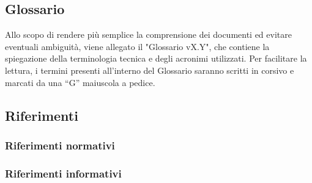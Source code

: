	\subsection{Glossario}
		Allo scopo di rendere più semplice la comprensione dei documenti ed evitare eventuali ambiguità, viene allegato il "Glossario vX.Y", che contiene la spiegazione della terminologia tecnica e degli acronimi utilizzati. Per facilitare la lettura, i termini presenti all'interno del Glossario saranno scritti in corsivo e marcati da una “G” maiuscola a pedice.
	\subsection{Riferimenti}
		\subsubsection{Riferimenti normativi}
		\subsubsection{Riferimenti informativi}